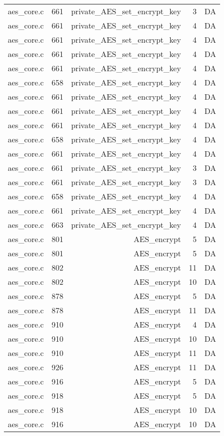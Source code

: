 \begin{table}[h]
{\begin{tabular}{clrrr}
aes\_core.c&661&private\_AES\_set\_encrypt\_key&3 &DA\\
aes\_core.c&661&private\_AES\_set\_encrypt\_key&4 &DA\\
aes\_core.c&661&private\_AES\_set\_encrypt\_key&4 &DA\\
aes\_core.c&661&private\_AES\_set\_encrypt\_key&4 &DA\\
aes\_core.c&661&private\_AES\_set\_encrypt\_key&4 &DA\\
aes\_core.c&658&private\_AES\_set\_encrypt\_key&4 &DA\\
aes\_core.c&661&private\_AES\_set\_encrypt\_key&4 &DA\\
aes\_core.c&661&private\_AES\_set\_encrypt\_key&4 &DA\\
aes\_core.c&661&private\_AES\_set\_encrypt\_key&4 &DA\\
aes\_core.c&658&private\_AES\_set\_encrypt\_key&4 &DA\\
aes\_core.c&661&private\_AES\_set\_encrypt\_key&4 &DA\\
aes\_core.c&661&private\_AES\_set\_encrypt\_key&3 &DA\\
aes\_core.c&661&private\_AES\_set\_encrypt\_key&3 &DA\\
aes\_core.c&658&private\_AES\_set\_encrypt\_key&4 &DA\\
aes\_core.c&661&private\_AES\_set\_encrypt\_key&4 &DA\\
aes\_core.c&663&private\_AES\_set\_encrypt\_key&4 &DA\\
aes\_core.c&801&AES\_encrypt&5 &DA\\
aes\_core.c&801&AES\_encrypt&5 &DA\\
aes\_core.c&802&AES\_encrypt&11&DA\\
aes\_core.c&802&AES\_encrypt&10&DA\\
aes\_core.c&878&AES\_encrypt&5 &DA\\
aes\_core.c&878&AES\_encrypt&11&DA\\
aes\_core.c&910&AES\_encrypt&4 &DA\\
aes\_core.c&910&AES\_encrypt&10&DA\\
aes\_core.c&910&AES\_encrypt&11&DA\\
aes\_core.c&926&AES\_encrypt&11&DA\\
aes\_core.c&916&AES\_encrypt&5 &DA\\
aes\_core.c&918&AES\_encrypt&5 &DA\\
aes\_core.c&918&AES\_encrypt&10&DA\\
aes\_core.c&916&AES\_encrypt&10&DA\\

\end{tabular}}
\end{table}
